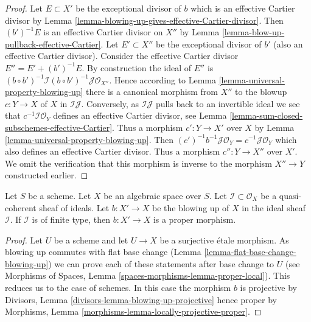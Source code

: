 \begin{proof}
Let $E \subset X'$ be the exceptional divisor of $b$ which is an effective
Cartier divisor by
Lemma \ref{lemma-blowing-up-gives-effective-Cartier-divisor}.
Then $(b')^{-1}E$ is an effective Cartier divisor on $X''$ by
Lemma \ref{lemma-blow-up-pullback-effective-Cartier}.
Let $E' \subset X''$ be the exceptional divisor of $b'$ (also an effective
Cartier divisor). Consider the effective Cartier divisor
$E'' = E' + (b')^{-1}E$. By construction the ideal of $E''$ is
$(b \circ b')^{-1}\mathcal{I} (b \circ b')^{-1}\mathcal{J} \mathcal{O}_{X''}$.
Hence according to Lemma \ref{lemma-universal-property-blowing-up}
there is a canonical morphism from $X''$ to the blowup $c : Y \to X$
of $X$ in $\mathcal{I}\mathcal{J}$. Conversely, as $\mathcal{I}\mathcal{J}$
pulls back to an invertible ideal we see that
$c^{-1}\mathcal{I}\mathcal{O}_Y$ defines
an effective Cartier divisor, see
Lemma \ref{lemma-sum-closed-subschemes-effective-Cartier}.
Thus a morphism $c' : Y \to X'$ over $X$ by
Lemma \ref{lemma-universal-property-blowing-up}.
Then $(c')^{-1}b^{-1}\mathcal{J}\mathcal{O}_Y = c^{-1}\mathcal{J}\mathcal{O}_Y$
which also defines an effective Cartier divisor. Thus a morphism
$c'' : Y \to X''$ over $X'$. We omit the verification that this
morphism is inverse to the morphism $X'' \to Y$ constructed earlier.
\end{proof}

\begin{lemma}
\label{lemma-blowing-up-projective}
Let $S$ be a scheme. Let $X$ be an algebraic space over $S$.
Let $\mathcal{I} \subset \mathcal{O}_X$ be a quasi-coherent
sheaf of ideals. Let $b : X' \to X$ be the blowing up of $X$
in the ideal sheaf $\mathcal{I}$. If $\mathcal{I}$ is of finite type, then
$b : X' \to X$ is a proper morphism.
\end{lemma}

\begin{proof}
Let $U$ be a scheme and let $U \to X$ be a surjective \'etale morphism.
As blowing up commutes with flat base change
(Lemma \ref{lemma-flat-base-change-blowing-up})
we can prove each of these statements after base change to $U$
(see Morphisms of Spaces, Lemma
\ref{spaces-morphisms-lemma-proper-local}).
This reduces us to the case of schemes.
In this case the morphism $b$ is projective by
Divisors, Lemma \ref{divisors-lemma-blowing-up-projective}
hence proper by
Morphisms, Lemma \ref{morphisms-lemma-locally-projective-proper}.
\end{proof}


